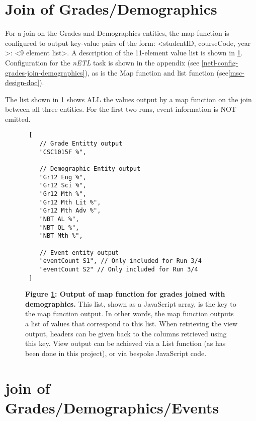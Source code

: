 \section{Join of Grades/Demographics}
For a join on the Grades and Demographics entities, the map function is configured to output key-value pairs of the form: \textless studentID, courseCode, year \textgreater : <9 element list>. A description of the 11-element value list is shown in \ref{grades-join-demographics-output}. Configuration for the \textit{nETL} task is shown in the appendix (see \ref{netl-config-grades-join-demographics}), as is the Map function and list function (see\ref{msc-design-doc}).

The list shown in \ref{grades-join-demographics-output} shows ALL the values output by a map function on the join between all three entities. For the first two runs, event information is NOT emitted.

\begin{figure}[ht]
    \centering
    \begin{verbatim}
 [
    // Grade Entitty output
    "CSC1015F %",

    // Demographic Entity output
    "Gr12 Eng %", 
    "Gr12 Sci %",
    "Gr12 Mth %",
    "Gr12 Mth Lit %",
    "Gr12 Mth Adv %",
    "NBT AL %",
    "NBT QL %",
    "NBT Mth %",

    // Event entity output
    "eventCount S1", // Only included for Run 3/4
    "eventCount S2" // Only included for Run 3/4
 ]    
    \end{verbatim}
    \caption[2-way-join map output]{\textbf{Figure \ref{grades-join-demographics-output}: Output of map function for grades joined with demographics.} This list, shown as a JavaScript array, is the key to the map function output. In other words, the map function outputs a list of values that correspond to this list. When retrieving the view output, headers can be given back to the columns retrieved using this key. View output can be achieved via a List function (as has been done in this project), or via bespoke JavaScript code.}
    \label{grades-join-demographics-output}
\end{figure}



\section{join of Grades/Demographics/Events}


